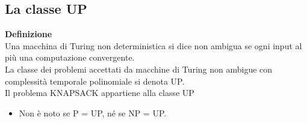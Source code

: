 \subsection{La classe UP}
\textbf{Definizione}\\
Una macchina di Turing non deterministica si dice non ambigua se ogni input al più una computazione convergente.
\\La classe dei problemi accettati da macchine di Turing non ambigue con
complessità temporale polinomiale si denota UP.
\\Il problema KNAPSACK appartiene alla classe UP
\begin{itemize}
    \item Non è noto se P = UP, né se NP = UP.
\end{itemize}